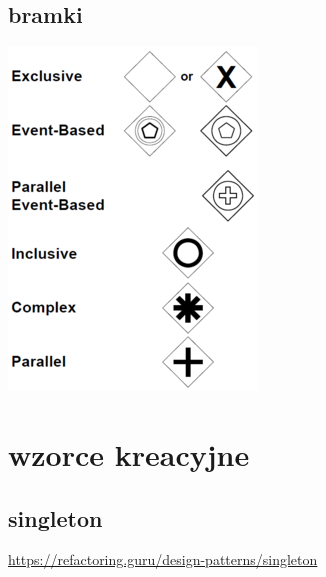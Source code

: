 \documentclass[11pt]{article}
\begin{document}
\subsection{bramki}
\label{sec:org7de5f16}
\begin{center}
\includegraphics[width=.9\linewidth]{./bpmngate.png}
\end{center}
\section{wzorce kreacyjne}
\label{sec:org1b15826}
\subsection{singleton}
\label{sec:orgfb42516}
\url{https://refactoring.guru/design-patterns/singleton}
\end{document}

